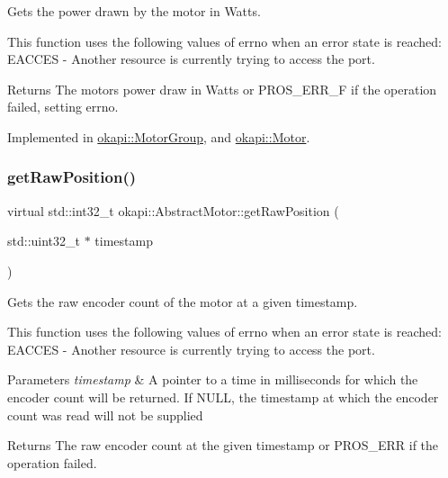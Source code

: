 Gets the power drawn by the motor in Watts.

This function uses the following values of errno when an error state is reached\+: E\+A\+C\+C\+ES -\/ Another resource is currently trying to access the port.

\begin{DoxyReturn}{Returns}
The motor\textquotesingle{}s power draw in Watts or P\+R\+O\+S\+\_\+\+E\+R\+R\+\_\+F if the operation failed, setting errno. 
\end{DoxyReturn}


Implemented in \mbox{\hyperlink{classokapi_1_1MotorGroup_a67bdc04d59ba8293ccd58d26b849c9f0}{okapi\+::\+Motor\+Group}}, and \mbox{\hyperlink{classokapi_1_1Motor_a992171c86829e52f5418988fada0b6fa}{okapi\+::\+Motor}}.

\mbox{\label{classokapi_1_1AbstractMotor_aa34fefa954fbff26e3d68e59c4f10964}} 
\subsubsection{\texorpdfstring{getRawPosition()}{getRawPosition()}}
{\footnotesize\ttfamily virtual std\+::int32\+\_\+t okapi\+::\+Abstract\+Motor\+::get\+Raw\+Position (\begin{DoxyParamCaption}\item[{std\+::uint32\+\_\+t $\ast$}]{timestamp }\end{DoxyParamCaption})\hspace{0.3cm}{\ttfamily [pure virtual]}}

Gets the raw encoder count of the motor at a given timestamp.

This function uses the following values of errno when an error state is reached\+: E\+A\+C\+C\+ES -\/ Another resource is currently trying to access the port.


\begin{DoxyParams}{Parameters}
{\em timestamp} & A pointer to a time in milliseconds for which the encoder count will be returned. If N\+U\+LL, the timestamp at which the encoder count was read will not be supplied\\
\hline
\end{DoxyParams}
\begin{DoxyReturn}{Returns}
The raw encoder count at the given timestamp or P\+R\+O\+S\+\_\+\+E\+RR if the operation failed. 
\end{DoxyReturn}



